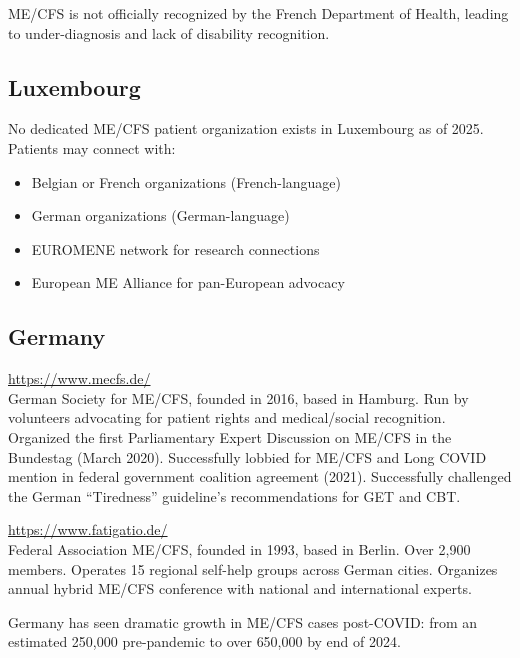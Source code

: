 \begin{remark}
ME/CFS is not officially recognized by the French Department of Health, leading to under-diagnosis and lack of disability recognition.
\end{remark}

\subsection{Luxembourg}

No dedicated ME/CFS patient organization exists in Luxembourg as of 2025. Patients may connect with:
\begin{itemize}
    \item Belgian or French organizations (French-language)
    \item German organizations (German-language)
    \item EUROMENE network for research connections
    \item European ME Alliance for pan-European advocacy
\end{itemize}

\subsection{Germany}
\label{subsec:germany-orgs}

\begin{description}[style=nextline]
\item[Deutsche Gesellschaft für ME/CFS] \hfill \url{https://www.mecfs.de/}\\
German Society for ME/CFS, founded in 2016, based in Hamburg. Run by volunteers advocating for patient rights and medical/social recognition. Organized the first Parliamentary Expert Discussion on ME/CFS in the Bundestag (March 2020). Successfully lobbied for ME/CFS and Long COVID mention in federal government coalition agreement (2021). Successfully challenged the German ``Tiredness'' guideline's recommendations for GET and CBT.

\item[Fatigatio e.V.] \hfill \url{https://www.fatigatio.de/}\\
Federal Association ME/CFS, founded in 1993, based in Berlin. Over 2,900 members. Operates 15 regional self-help groups across German cities. Organizes annual hybrid ME/CFS conference with national and international experts.
\end{description}

\begin{remark}
Germany has seen dramatic growth in ME/CFS cases post-COVID: from an estimated 250,000 pre-pandemic to over 650,000 by end of 2024.
\end{remark}

